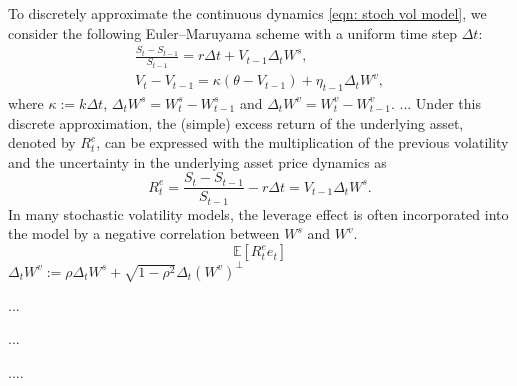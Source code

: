 To discretely approximate the continuous dynamics \eqref{eqn: stoch vol model}, we consider the following Euler–Maruyama scheme with a uniform time step $\Delta t$:
\begin{equation} \label{eqn: discrete stoch vol model}
\begin{gathered}
\frac{S_{t} - S_{t-1}}{S_{t-1}} = r \Delta t + V_{t-1} \Delta_t W^s, \\
V_{t} - V_{t-1} = \kappa \left( \theta - V_{t-1} \right) + \eta_{t-1}  \Delta_t W^v,
\end{gathered}
\end{equation}
where $\kappa := k \Delta t$, $\Delta_t W^s=W_t^s - W_{t-1}^s$ and $\Delta_t W^v = W_t^v - W_{t-1}^v$.
... %
Under this discrete approximation, the (simple) excess return of the underlying asset, denoted by $R_{t}^e$, can be expressed with the multiplication of the previous volatility and the uncertainty in the underlying asset price dynamics as
\begin{equation*}
    R_{t}^e = \frac{S_t - S_{t-1}}{S_{t-1}} - r\Delta t = V_{t-1} \Delta_t W^s.
\end{equation*}
In many stochastic volatility models, the leverage effect is often incorporated into the model by a negative correlation between $W^s$ and $W^v$. 
\begin{equation*}
    \mathbb{E} \left[ R_t^e e_t \right]
\end{equation*}
$\Delta_t W^v := \rho \Delta_t W^s + \sqrt{1-\rho^2} \Delta_t (W^v)^{\perp}$



... %


... %

....

